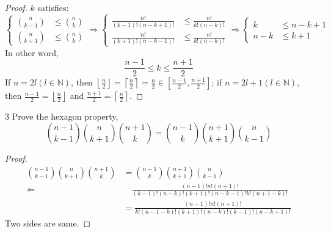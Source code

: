 \documentclass[a4paper,12pt]{article}
\theoremstyle{definition}
\newenvironment{problems}{\begin{list}{}{\renewcommand{\makelabel}[1]{\textbf{##1}\hfil}}}{\end{list}}
\begin{document}
\begin{problems}
\begin{proof}
        $k$ satisfies:
        \begin{equation*}
            \left\{
            \begin{aligned}
                \binom{n}{k-1}&\leq\binom{n}{k}\\
                \binom{n}{k+1}&\leq\binom{n}{k}
            \end{aligned}
            \right.
            \Rightarrow
            \left\{
                \begin{aligned}
                    \frac{n!}{(k-1)!(n-k+1)!}&\leq\frac{n!}{k!(n-k)!}\\
                    \frac{n!}{(k+1)!(n-k-1)!}&\leq\frac{n!}{k!(n-k)!}
                \end{aligned}
            \right.
            \Rightarrow
            \left\{
                \begin{aligned}
                    k&\leq n-k+1\\
                    n-k&\leq k+1
                \end{aligned}
            \right.
        \end{equation*}
        In other word,
        \begin{equation*}
            \frac{n-1}{2}\leq k \leq \frac{n+1}{2}
        \end{equation*}
        If $n=2l(l\in\mathbb{N})$, then $\left\lfloor \frac{n}{2}\right\rfloor=\left\lceil \frac{n}{2}\right\rceil=\frac{n}{2}\in\left[\frac{n-1}{2},\frac{n+1}{2}\right]$; if $n=2l+1(l\in\mathbb{N})$, then $\frac{n-1}{2}=\left\lfloor \frac{n}{2}\right\rfloor$ and $\frac{n+1}{2}=\left\lceil \frac{n}{2}\right\rceil$.
    \end{proof} 
    \item[3]Prove the hexagon property,
    \begin{equation*}
        \binom{n-1}{k-1}\binom{n}{k+1}\binom{n+1}{k}=\binom{n-1}{k}\binom{n+1}{k+1}\binom{n}{k-1}
    \end{equation*}
    \begin{proof}
        \begin{align*}
            \binom{n-1}{k-1}\binom{n}{k+1}\binom{n+1}{k}&=\binom{n-1}{k}\binom{n+1}{k+1}\binom{n}{k-1}\\
            \Leftarrow&\quad \frac{(n-1)!n!(n+1)!}{(k-1)!(n-k)!(k+1)!(n-k-1)!k!(n+1-k)!} \\&= \frac{(n-1)!n!(n+1)!}{k!(n-1-k)!(k+1)!(n-k)!(k-1)!(n-k+1)!}
        \end{align*}
        Two sides are same.
    \end{proof}

\end{problems}
\end{document}

